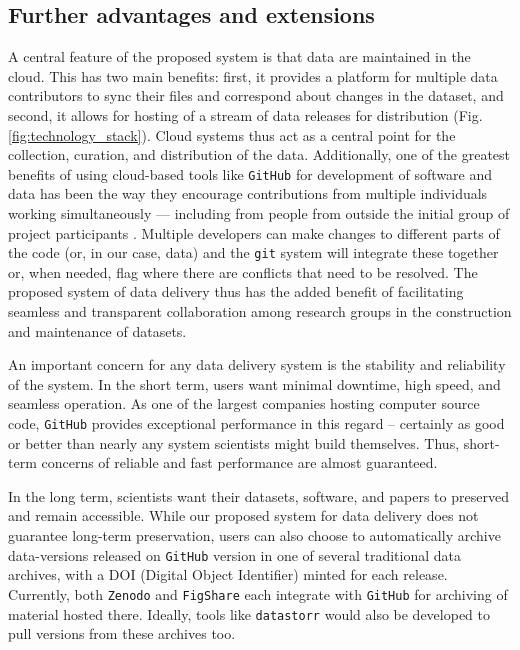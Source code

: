 \documentclass[a4paper,num-refs]{assets/oup-contemporary}
\begin{document}
\subsection{Further advantages and extensions}

A central feature of the proposed system is that data are maintained in the cloud. This has two main benefits: first, it provides a platform for multiple data contributors to sync their files and correspond about changes in the dataset, and second, it allows for hosting of a stream of data releases for distribution (Fig. \ref{fig:technology_stack}). Cloud systems thus act as a central point for the collection, curation, and distribution of the data. Additionally, one of the greatest benefits of using cloud-based tools like  \texttt{GitHub} for development of software and data has been the way they encourage contributions from multiple individuals working simultaneously --- including from people from outside the initial group of project participants \cite{Rogers-2013, Perkel-2016}. Multiple developers can make changes to different parts of the code (or, in our case, data) and the \texttt{git} system will integrate these together or, when needed, flag where there are conflicts that need to be resolved. The proposed system of data delivery thus has the added benefit of facilitating seamless and transparent collaboration among research groups in the construction and maintenance of datasets.

An important concern for any data delivery system is the stability and reliability of the system. In the short term, users want minimal downtime, high speed, and seamless operation. As one of the largest companies hosting computer source code, \texttt{GitHub} provides exceptional performance in this regard -- certainly as good or better than nearly any system scientists might build themselves. Thus, short-term concerns of reliable and fast performance are almost guaranteed.

In the long term, scientists want their datasets, software, and papers to preserved and remain accessible. While our proposed system for data delivery does not guarantee long-term preservation, users can also choose to automatically archive data-versions released on \texttt{GitHub} version in one of several traditional data archives, with a DOI (Digital Object Identifier) minted for each release. Currently, both \texttt{Zenodo} and  \texttt{FigShare} each integrate with \texttt{GitHub} for archiving of material hosted there. Ideally, tools like \texttt{datastorr} would also be developed to pull versions from these archives too. 
\end{document}
